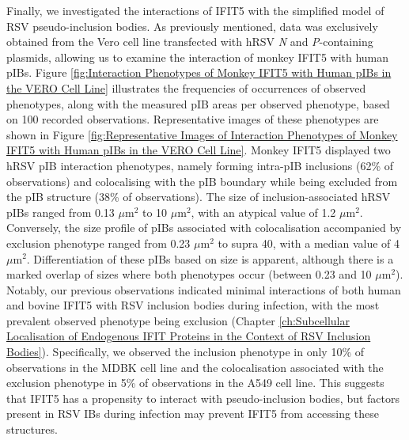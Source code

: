Finally, we investigated the interactions of IFIT5 with the simplified model of RSV pseudo-inclusion bodies. As previously mentioned, data was exclusively obtained from the Vero cell line transfected with hRSV \textit{N} and \textit{P}-containing plasmids, allowing us to examine the interaction of monkey IFIT5 with human pIBs. Figure \ref{fig:Interaction Phenotypes of Monkey IFIT5 with Human pIBs in the VERO Cell Line} illustrates the frequencies of occurrences of observed phenotypes, along with the measured pIB areas per observed phenotype, based on 100 recorded observations. Representative images of these phenotypes are shown in Figure \ref{fig:Representative Images of Interaction Phenotypes of Monkey IFIT5 with Human pIBs in the VERO Cell Line}. Monkey IFIT5 displayed two hRSV pIB interaction phenotypes, namely forming intra-pIB inclusions (62\% of observations) and colocalising with the pIB boundary while being excluded from the pIB structure (38\% of observations). The size of inclusion-associated hRSV pIBs ranged from 0.13 \(\mu \mbox{m}^2\) to 10 \(\mu \mbox{m}^2\), with an atypical value of 1.2 \(\mu \mbox{m}^2\). Conversely, the size profile of pIBs associated with colocalisation accompanied by exclusion phenotype ranged from 0.23 \(\mu \mbox{m}^2\) to supra 40, with a median value of 4 \(\mu \mbox{m}^2\). Differentiation of these pIBs based on size is apparent, although there is a marked overlap of sizes where both phenotypes occur (between 0.23 and 10 \(\mu \mbox{m}^2\)). Notably, our previous observations indicated minimal interactions of both human and bovine IFIT5 with RSV inclusion bodies during infection, with the most prevalent observed phenotype being exclusion (Chapter \ref{ch:Subcellular Localisation of Endogenous IFIT Proteins in the Context of RSV Inclusion Bodies}). Specifically, we observed the inclusion phenotype in only 10\% of observations in the MDBK cell line and the colocalisation associated with the exclusion phenotype in 5\% of observations in the A549 cell line. This suggests that IFIT5 has a propensity to interact with pseudo-inclusion bodies, but factors present in RSV IBs during infection may prevent IFIT5 from accessing these structures.

